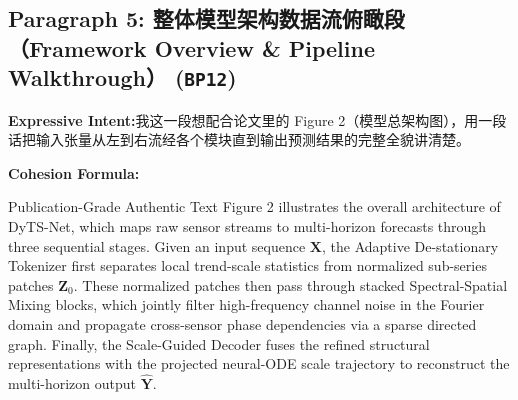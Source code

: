 \subsection*{Paragraph 5: 整体模型架构数据流俯瞰段（Framework Overview \& Pipeline Walkthrough） (\texttt{BP12})}
\noindent\textbf{Expressive Intent:}\enspace 我这一段想配合论文里的 Figure 2（模型总架构图），用一段话把输入张量从左到右流经各个模块直到输出预测结果的完整全貌讲清楚。\par
\noindent\textbf{Cohesion Formula:}\par\vspace{4pt}
\begin{ExampleBox}{Publication-Grade Authentic Text}
Figure 2 illustrates the overall architecture of DyTS-Net, which maps raw sensor streams to multi-horizon forecasts through three sequential stages. Given an input sequence $\mathbf{X}$, the Adaptive De-stationary Tokenizer first separates local trend-scale statistics from normalized sub-series patches $\mathbf{Z}_0$. These normalized patches then pass through stacked Spectral-Spatial Mixing blocks, which jointly filter high-frequency channel noise in the Fourier domain and propagate cross-sensor phase dependencies via a sparse directed graph. Finally, the Scale-Guided Decoder fuses the refined structural representations with the projected neural-ODE scale trajectory to reconstruct the multi-horizon output $\hat{\mathbf{Y}}$.
\end{ExampleBox}
